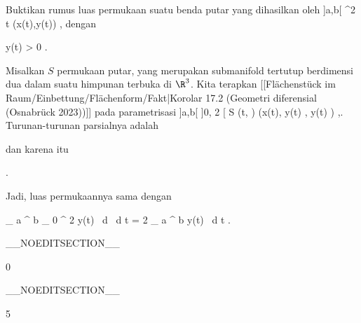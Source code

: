 {

Buktikan rumus luas permukaan suatu benda putar yang dihasilkan oleh
\maabbeledisp {\gamma} {]a,b[} {\R^2
} { t } {(x(t),y(t))
} {,}
dengan

\mavergleichskette
{\vergleichskette
{ y(t)
}
{ > }{ 0
}
{  }{
}
{    }{
}
{   }{
}
}
{}{}{.}

}
{

Misalkan $S$ permukaan putar, yang merupakan submanifold tertutup berdimensi dua dalam suatu himpunan terbuka di $\R^3$. Kita terapkan
[[Flächenstück im Raum/Einbettung/Flächenform/Fakt|Korolar 17.2 (Geometri diferensial (Osnabrück 2023))]]
pada parametrisasi
\maabbeledisp {} { ]a,b[ \times ]0, 2 \pi[} {S
} { (t, \alpha) } { (x(t),  y(t) \cos \alpha  , y(t) \sin \alpha  )
} {,}.
Turunan-turunan parsialnya adalah

 {  }

dan karena itu

 { . }

Jadi, luas permukaannya sama dengan

\mavergleichskettedisphandlinks
{\vergleichskettedisphandlinks
{ \int_{  a  }^{  b  } \int_{  0  }^{  2 \pi }  \cdot   y(t) \, d \alpha \, d t
}
{ =} { 2 \pi \int_{  a  }^{  b  }  \cdot   y(t) \, d t
}
{ } {
}
{ } {
}
{ } {
}
}
{}{}{.}

}

__NOEDITSECTION__

{0}

{

}
{  }

__NOEDITSECTION__

{5}

